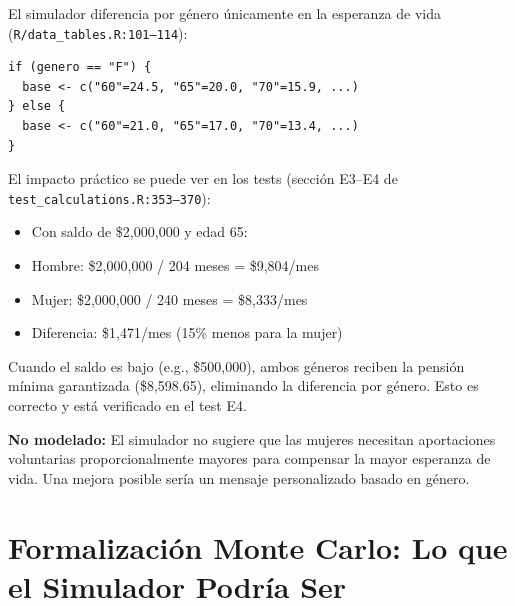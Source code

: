 \documentclass[11pt,a4paper]{report}
\begin{document}
\begin{tcolorbox}[colback=orange!5!white, colframe=orange!75!black, title=\textbf{Aplicaci\'on en C\'odigo: Diferenciaci\'on por G\'enero}]
El simulador diferencia por g\'enero \'unicamente en la esperanza de vida (\texttt{R/data\_tables.R:101--114}):

\begin{lstlisting}
if (genero == "F") {
  base <- c("60"=24.5, "65"=20.0, "70"=15.9, ...)
} else {
  base <- c("60"=21.0, "65"=17.0, "70"=13.4, ...)
}
\end{lstlisting}

El impacto pr\'actico se puede ver en los tests (secci\'on E3--E4 de \texttt{test\_calculations.R:353--370}):
\begin{itemize}
  \item Con saldo de \$2,000,000 y edad 65:
  \item Hombre: \$2,000,000 / 204 meses = \$9,804/mes
  \item Mujer: \$2,000,000 / 240 meses = \$8,333/mes
  \item Diferencia: \$1,471/mes (15\% menos para la mujer)
\end{itemize}

Cuando el saldo es bajo (e.g., \$500,000), ambos g\'eneros reciben la pensi\'on m\'inima garantizada (\$8,598.65), eliminando la diferencia por g\'enero. Esto es correcto y est\'a verificado en el test E4.

\textbf{No modelado:} El simulador no sugiere que las mujeres necesitan aportaciones voluntarias proporcionalmente mayores para compensar la mayor esperanza de vida. Una mejora posible ser\'ia un mensaje personalizado basado en g\'enero.
\end{tcolorbox}


\section{Formalizaci\'on Monte Carlo: Lo que el Simulador Podr\'ia Ser}
\end{document}
